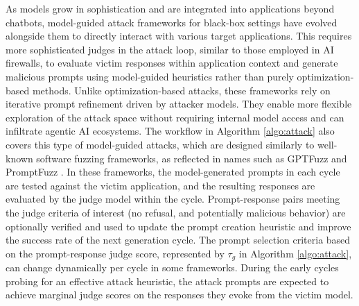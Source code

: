 \documentclass[conference,compsoc]{IEEEtran}
\begin{document}
As models grow in sophistication and are integrated into applications beyond chatbots, model-guided attack frameworks for black-box settings have evolved alongside them to directly interact with various target applications.
 This requires more sophisticated judges in the attack loop\cite{pair2023}, similar to those employed in AI firewalls, to evaluate victim responses within application context and generate malicious prompts using model-guided heuristics rather than purely optimization-based methods.
 Unlike optimization-based attacks, these frameworks rely on iterative prompt refinement driven by attacker models.
 They enable more flexible exploration of the attack space without requiring internal model access and can infiltrate agentic AI ecosystems.
 The workflow in Algorithm \ref{algo:attack} also covers this type of model-guided attacks, which are designed similarly to well-known software fuzzing frameworks, as reflected in names such as GPTFuzz and PromptFuzz \cite{llmfuzzer2024, yu2023gptfuzzer, yu2024promptfuzz, gt2025}.
In these frameworks, the model-generated prompts in each cycle are tested against the victim application, and the resulting responses are evaluated by the judge model within the cycle.
Prompt-response pairs meeting the judge criteria of interest (no refusal, and potentially malicious behavior) are optionally verified and used to update the prompt creation heuristic and improve the success rate of the next generation cycle.
The prompt selection criteria based on the prompt-response judge score, represented by $\tau_g$ in Algorithm \ref{algo:attack}, can change dynamically per cycle in some frameworks.
During the early cycles probing for an effective attack heuristic, the attack prompts are expected to achieve marginal judge scores on the responses they evoke from the victim model.
\end{document}
